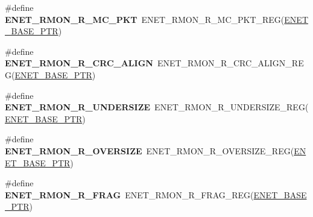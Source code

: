\begin{DoxyCompactItemize}
\item 
\hypertarget{group___e_n_e_t___register___accessor___macros_ga7c12300a354d5e4d7fcdba27b63f0258}{}\#define {\bfseries E\+N\+E\+T\+\_\+\+R\+M\+O\+N\+\_\+\+R\+\_\+\+M\+C\+\_\+\+P\+K\+T}~E\+N\+E\+T\+\_\+\+R\+M\+O\+N\+\_\+\+R\+\_\+\+M\+C\+\_\+\+P\+K\+T\+\_\+\+R\+E\+G(\hyperlink{group___e_n_e_t___peripheral_gab64a2d991cc2bd76dd55ee25a52dcb5c}{E\+N\+E\+T\+\_\+\+B\+A\+S\+E\+\_\+\+P\+T\+R})\label{group___e_n_e_t___register___accessor___macros_ga7c12300a354d5e4d7fcdba27b63f0258}

\item 
\hypertarget{group___e_n_e_t___register___accessor___macros_ga25e7f9008cb3109fa60252ee05422a39}{}\#define {\bfseries E\+N\+E\+T\+\_\+\+R\+M\+O\+N\+\_\+\+R\+\_\+\+C\+R\+C\+\_\+\+A\+L\+I\+G\+N}~E\+N\+E\+T\+\_\+\+R\+M\+O\+N\+\_\+\+R\+\_\+\+C\+R\+C\+\_\+\+A\+L\+I\+G\+N\+\_\+\+R\+E\+G(\hyperlink{group___e_n_e_t___peripheral_gab64a2d991cc2bd76dd55ee25a52dcb5c}{E\+N\+E\+T\+\_\+\+B\+A\+S\+E\+\_\+\+P\+T\+R})\label{group___e_n_e_t___register___accessor___macros_ga25e7f9008cb3109fa60252ee05422a39}

\item 
\hypertarget{group___e_n_e_t___register___accessor___macros_gac02167e9de47c2ce9a0dfb51f0b24fa1}{}\#define {\bfseries E\+N\+E\+T\+\_\+\+R\+M\+O\+N\+\_\+\+R\+\_\+\+U\+N\+D\+E\+R\+S\+I\+Z\+E}~E\+N\+E\+T\+\_\+\+R\+M\+O\+N\+\_\+\+R\+\_\+\+U\+N\+D\+E\+R\+S\+I\+Z\+E\+\_\+\+R\+E\+G(\hyperlink{group___e_n_e_t___peripheral_gab64a2d991cc2bd76dd55ee25a52dcb5c}{E\+N\+E\+T\+\_\+\+B\+A\+S\+E\+\_\+\+P\+T\+R})\label{group___e_n_e_t___register___accessor___macros_gac02167e9de47c2ce9a0dfb51f0b24fa1}

\item 
\hypertarget{group___e_n_e_t___register___accessor___macros_ga0b81baf39415b445c3454ff4edd8ec4d}{}\#define {\bfseries E\+N\+E\+T\+\_\+\+R\+M\+O\+N\+\_\+\+R\+\_\+\+O\+V\+E\+R\+S\+I\+Z\+E}~E\+N\+E\+T\+\_\+\+R\+M\+O\+N\+\_\+\+R\+\_\+\+O\+V\+E\+R\+S\+I\+Z\+E\+\_\+\+R\+E\+G(\hyperlink{group___e_n_e_t___peripheral_gab64a2d991cc2bd76dd55ee25a52dcb5c}{E\+N\+E\+T\+\_\+\+B\+A\+S\+E\+\_\+\+P\+T\+R})\label{group___e_n_e_t___register___accessor___macros_ga0b81baf39415b445c3454ff4edd8ec4d}

\item 
\hypertarget{group___e_n_e_t___register___accessor___macros_gad0856e86288f36006ca6d4adc2a2547a}{}\#define {\bfseries E\+N\+E\+T\+\_\+\+R\+M\+O\+N\+\_\+\+R\+\_\+\+F\+R\+A\+G}~E\+N\+E\+T\+\_\+\+R\+M\+O\+N\+\_\+\+R\+\_\+\+F\+R\+A\+G\+\_\+\+R\+E\+G(\hyperlink{group___e_n_e_t___peripheral_gab64a2d991cc2bd76dd55ee25a52dcb5c}{E\+N\+E\+T\+\_\+\+B\+A\+S\+E\+\_\+\+P\+T\+R})\label{group___e_n_e_t___register___accessor___macros_gad0856e86288f36006ca6d4adc2a2547a}


\end{DoxyCompactItemize}
